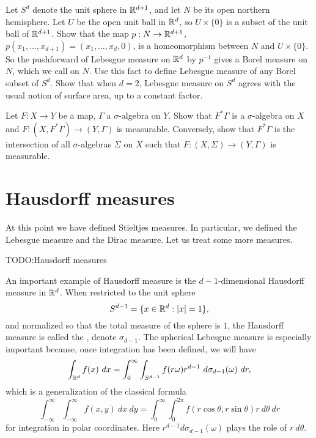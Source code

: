 \begin{exercise}\label{Lebesgue measure on sphere}
Let $S^{d}$ denote the unit sphere in $\mathbb{R}^{d+1}$, and let $N$ be its open northern hemisphere.
Let $U$ be the open unit ball in $\mathbb{R}^{d}$, so $U \times \{0\}$ is a subset of the unit ball of $\mathbb{R}^{d+1}$.
Show that the map $p: N \to \mathbb{R}^{d+1}$, $p(x_{1}, \dots, x_{d+1}) = (x_{1}, \dots, x_{d}, 0)$, is a homeomorphism between $N$ and $U \times \{0\}$.
So the pushforward of Lebesgue measure on $\mathbb{R}^{d}$ by $p^{-1}$ gives a Borel measure on $N$, which we call  on $N$.
Use this fact to define Lebesgue measure of any Borel subset of $S^{d}$.
Show that when $d = 2$, Lebesgue measure on $S^{d}$ agrees with the usual notion of surface area, up to a constant factor.
\end{exercise}

\begin{exercise}\label{pullback makes sense}
Let $F: X \to Y$ be a map, $\Gamma$ a $\sigma$-algebra on $Y$.
Show that $F^{*}\Gamma$ is a $\sigma$-algebra on $X$ and $F: (X, F^{*}\Gamma) \to (Y, \Gamma)$ is measurable.
Conversely, show that $F^{*}\Gamma$ is the intersection of all $\sigma$-algebras $\Sigma$ on $X$ such that $F: (X, \Sigma) \to (Y, \Gamma)$ is measurable.
\end{exercise}

\section{Hausdorff measures}
At this point we have defined Stieltjes measures.
In particular, we defined the Lebesgue measure and the Dirac measure.
Let us treat some more measures.

TODO:\@ Hausdorff measures


\begin{example}\label{Lebesgue measure on sphere}
An important example of Hausdorff measure is the $d-1$-dimensional Hausdorff measure in $\mathbb{R}^{d}$.
When restricted to the unit sphere
\[S^{d - 1} = \{x \in \mathbb{R}^{d}: |x| = 1\},\]
and normalized so that the total measure of the sphere is $1$, the Hausdorff measure is called the , denote $\sigma_{d - 1}$.
The spherical Lebesgue measure is especially important because, once integration has been defined, we will have
\[\int_{\mathbb{R}^{d}} f(x) ~dx = \int_{0}^{\infty} \int_{S^{d - 1}} f(r\omega) r^{d - 1}~d\sigma_{d - 1}(\omega) ~dr,\]
which is a generalization of the classical formula
\[\int_{-\infty}^{\infty} \int_{-\infty}^{\infty} f(x, y) ~dx ~dy = \int_{0}^{\infty} \int_{0}^{2\pi} f(r \cos \theta, r \sin \theta) r~d\theta ~dr\]
for integration in polar coordinates. Here $r^{d - 1} d\sigma_{d - 1}(\omega)$ plays the role of $r~d\theta$.
\end{example}



